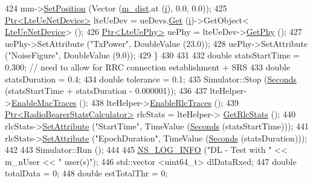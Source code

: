 \begin{DoxyCode}
424       mm->\hyperlink{classns3_1_1MobilityModel_ac584b3d5a309709d2f13ed6ada1e7640}{SetPosition} (Vector (\hyperlink{classLenaTdBetFfMacSchedulerTestCase2_aedff5ffd37cafea8c5409c5a72d9f380}{m\_dist}.at (\hyperlink{bernuolliDistribution_8m_a6f6ccfcf58b31cb6412107d9d5281426}{i}), 0.0, 0.0));
425       \hyperlink{classns3_1_1Ptr}{Ptr<LteUeNetDevice>} lteUeDev = ueDevs.\hyperlink{classns3_1_1NetDeviceContainer_a677d62594b5c9d2dea155cc5045f4d0b}{Get} (\hyperlink{bernuolliDistribution_8m_a6f6ccfcf58b31cb6412107d9d5281426}{i})->GetObject<
      \hyperlink{classns3_1_1LteUeNetDevice}{LteUeNetDevice}> ();
426       \hyperlink{classns3_1_1Ptr}{Ptr<LteUePhy>} uePhy = lteUeDev->\hyperlink{classns3_1_1LteUeNetDevice_a2a9940a1e457a8bf3dae87fed4199c7a}{GetPhy} ();
427       uePhy->SetAttribute (\textcolor{stringliteral}{"TxPower"}, DoubleValue (23.0));
428       uePhy->SetAttribute (\textcolor{stringliteral}{"NoiseFigure"}, DoubleValue (9.0));
429     \}
430 
431 
432   \textcolor{keywordtype}{double} statsStartTime = 0.300; \textcolor{comment}{// need to allow for RRC connection establishment + SRS}
433   \textcolor{keywordtype}{double} statsDuration = 0.4;
434   \textcolor{keywordtype}{double} tolerance = 0.1;
435   Simulator::Stop (\hyperlink{group__timecivil_ga33c34b816f8ff6628e33d5c8e9713b9e}{Seconds} (statsStartTime + statsDuration - 0.000001));
436 
437   lteHelper->\hyperlink{classns3_1_1LteHelper_affa3a12841520407d3662417fe41863d}{EnableMacTraces} ();
438   lteHelper->\hyperlink{classns3_1_1LteHelper_abadfdd04d30b261e9b6f0846b4784928}{EnableRlcTraces} ();
439   \hyperlink{classns3_1_1Ptr}{Ptr<RadioBearerStatsCalculator>} rlcStats = lteHelper->
      \hyperlink{classns3_1_1LteHelper_a6eb438ccf69642e3863adea4991fa2ca}{GetRlcStats} ();
440   rlcStats->\hyperlink{classns3_1_1ObjectBase_ac60245d3ea4123bbc9b1d391f1f6592f}{SetAttribute} (\textcolor{stringliteral}{"StartTime"}, TimeValue (\hyperlink{group__timecivil_ga33c34b816f8ff6628e33d5c8e9713b9e}{Seconds} (statsStartTime)));
441   rlcStats->\hyperlink{classns3_1_1ObjectBase_ac60245d3ea4123bbc9b1d391f1f6592f}{SetAttribute} (\textcolor{stringliteral}{"EpochDuration"}, TimeValue (\hyperlink{group__timecivil_ga33c34b816f8ff6628e33d5c8e9713b9e}{Seconds} (statsDuration)));
442 
443   Simulator::Run ();
444 
445   \hyperlink{group__logging_gafbd73ee2cf9f26b319f49086d8e860fb}{NS\_LOG\_INFO} (\textcolor{stringliteral}{"DL - Test with "} << m\_nUser << \textcolor{stringliteral}{" user(s)"});
446   std::vector <uint64\_t> dlDataRxed;
447   \textcolor{keywordtype}{double} totalData = 0;
448   \textcolor{keywordtype}{double} estTotalThr = 0;

\end{DoxyCode}
